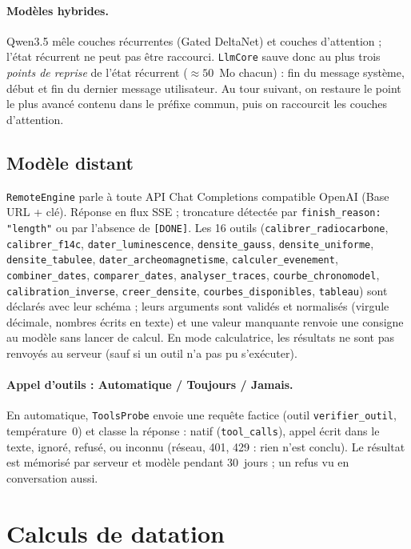 \documentclass[11pt,a4paper]{article}
\newcommand{\code}[1]{\texttt{\small #1}}
\begin{document}
\paragraph{Modèles hybrides.} Qwen3.5 mêle couches récurrentes (Gated DeltaNet) et couches d'attention ; l'état
récurrent ne peut pas être raccourci. \code{LlmCore} sauve donc au plus trois \emph{points de reprise} de l'état récurrent
($\approx 50$~Mo chacun) : fin du message système, début et fin du dernier message utilisateur. Au tour suivant, on
restaure le point le plus avancé contenu dans le préfixe commun, puis on raccourcit les couches d'attention.

\subsection{Modèle distant}
\code{RemoteEngine} parle à toute API Chat Completions compatible OpenAI (Base URL + clé). Réponse en flux SSE ;
troncature détectée par \code{finish\_reason: "length"} ou par l'absence de \code{[DONE]}. Les 16 outils
(\code{calibrer\_radiocarbone}, \code{calibrer\_f14c}, \code{dater\_luminescence}, \code{densite\_gauss},
\code{densite\_uniforme}, \code{densite\_tabulee}, \code{dater\_archeomagnetisme}, \code{calculer\_evenement},
\code{combiner\_dates}, \code{comparer\_dates}, \code{analyser\_traces}, \code{courbe\_chronomodel},
\code{calibration\_inverse}, \code{creer\_densite},
\code{courbes\_disponibles}, \code{tableau}) sont déclarés avec leur schéma ; leurs arguments sont validés et normalisés
(virgule décimale, nombres écrits en texte) et une valeur manquante renvoie une consigne au modèle sans lancer de calcul.
En mode calculatrice, les résultats ne sont pas renvoyés au serveur (sauf si un outil n'a pas pu s'exécuter).

\paragraph{Appel d'outils : Automatique / Toujours / Jamais.} En automatique, \code{ToolsProbe} envoie une requête
factice (outil \code{verifier\_outil}, température~0) et classe la réponse : natif (\code{tool\_calls}), appel écrit
dans le texte, ignoré, refusé, ou inconnu (réseau, 401, 429 : rien n'est conclu). Le résultat est mémorisé par serveur
et modèle pendant 30~jours ; un refus vu en conversation aussi.

\section{Calculs de datation}
\end{document}
